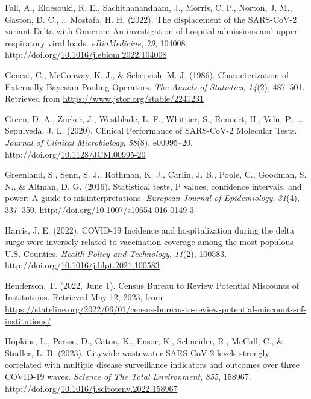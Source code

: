 \documentclass[12pt,twoside]{smiththesis}
\newlength{\cslhangindent}
\newenvironment{CSLReferences}[2] %
 {%
\setlength{\parindent}{0pt}
\ifodd #1 \everypar{\setlength{\hangindent}{\cslhangindent}}\ignorespaces\fi
\ifnum #2 > 0
\setlength{\parskip}{#2\baselineskip}
  \fi
}%
{}
\begin{document}
\begin{CSLReferences}{1}{0}
\leavevmode{}%
Fall, A., Eldesouki, R. E., Sachithanandham, J., Morris, C. P., Norton, J. M., Gaston, D. C., \ldots{} Mostafa, H. H. (2022). The displacement of the {SARS-CoV-2} variant {Delta} with {Omicron}: {An} investigation of hospital admissions and upper respiratory viral loads. \emph{eBioMedicine}, \emph{79}, 104008. http://doi.org/\href{https://doi.org/10.1016/j.ebiom.2022.104008}{10.1016/j.ebiom.2022.104008}

\leavevmode{}%
Genest, C., McConway, K. J., \& Schervish, M. J. (1986). Characterization of {Externally Bayesian Pooling Operators}. \emph{The Annals of Statistics}, \emph{14}(2), 487--501. Retrieved from \url{https://www.jstor.org/stable/2241231}

\leavevmode{}%
Green, D. A., Zucker, J., Westblade, L. F., Whittier, S., Rennert, H., Velu, P., \ldots{} Sepulveda, J. L. (2020). Clinical {Performance} of {SARS-CoV-2 Molecular Tests}. \emph{Journal of Clinical Microbiology}, \emph{58}(8), e00995--20. http://doi.org/\href{https://doi.org/10.1128/JCM.00995-20}{10.1128/JCM.00995-20}

\leavevmode{}%
Greenland, S., Senn, S. J., Rothman, K. J., Carlin, J. B., Poole, C., Goodman, S. N., \& Altman, D. G. (2016). Statistical tests, {P} values, confidence intervals, and power: A guide to misinterpretations. \emph{European Journal of Epidemiology}, \emph{31}(4), 337--350. http://doi.org/\href{https://doi.org/10.1007/s10654-016-0149-3}{10.1007/s10654-016-0149-3}

\leavevmode{}%
Harris, J. E. (2022). {COVID-19 Incidence} and hospitalization during the delta surge were inversely related to vaccination coverage among the most populous {U}.{S}. {Counties}. \emph{Health Policy and Technology}, \emph{11}(2), 100583. http://doi.org/\href{https://doi.org/10.1016/j.hlpt.2021.100583}{10.1016/j.hlpt.2021.100583}

\leavevmode{}%
Henderson, T. (2022, June 1). Census {Bureau} to {Review Potential Miscounts} of {Institutions}. Retrieved May 12, 2023, from \url{https://stateline.org/2022/06/01/census-bureau-to-review-potential-miscounts-of-institutions/}

\leavevmode{}%
Hopkins, L., Persse, D., Caton, K., Ensor, K., Schneider, R., McCall, C., \& Stadler, L. B. (2023). Citywide wastewater {SARS-CoV-2} levels strongly correlated with multiple disease surveillance indicators and outcomes over three {COVID-19} waves. \emph{Science of The Total Environment}, \emph{855}, 158967. http://doi.org/\href{https://doi.org/10.1016/j.scitotenv.2022.158967}{10.1016/j.scitotenv.2022.158967}


\end{CSLReferences}
\end{document}
